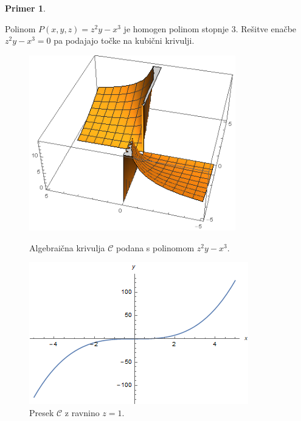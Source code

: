\documentclass[12pt,a4paper,twoside]{article}
\theoremstyle{definition} %
\newtheorem{primer}[definicija]{Primer}
\theoremstyle{plain} %
\numberwithin{equation}{section}  %
\begin{document}
\begin{primer}~

Polinom $P(x,y,z) = z^2y-x^3$ je homogen polinom stopnje $3$. Rešitve enačbe $z^2y-x^3 = 0$ pa podajajo točke na kubični krivulji.
\begin{figure}[t]
  \centering
\begin{minipage}{.45\textwidth}
\centering
  \includegraphics[width=0.8\textwidth]{images/krivulja.png}
  \caption[Primer algebraične krivulje.]{Algebraična krivulja $\mathcal{C}$ podana s polinomom $z^2y-x^3$.}
  \label{fig:krivulja}
\end{minipage}%
\hfill
\begin{minipage}{.45\textwidth}
\centering
\includegraphics[scale=0.5]{images/projektivnaz.png}
\caption[Presek algebraične krivulje z ravnino $z=1$.]{Presek $\mathcal{C}$ z ravnino $z=1$.}
\label{fig:projektivnaz}
\end{minipage}
\end{figure}



\end{primer}
\end{document}
